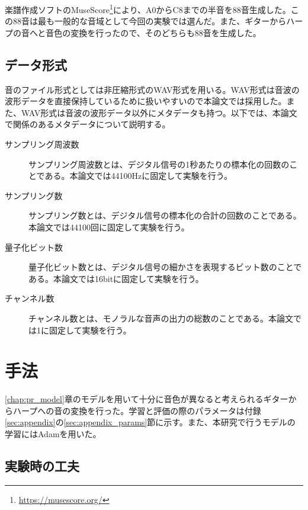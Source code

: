 楽譜作成ソフトのMuseScore\footnote{\url{https://musescore.org/}}により、A0からC8までの半音を88音生成した。この88音は最も一般的な音域として今回の実験では選んだ。また、ギターからハープの音へと音色の変換を行ったので、そのどちらも88音を生成した。

\subsection{データ形式}

音のファイル形式としては非圧縮形式のWAV形式を用いる。WAV形式は音波の波形データを直接保持しているために扱いやすいので本論文では採用した。また、WAV形式は音波の波形データ以外にメタデータも持つ。以下では、本論文で関係のあるメタデータについて説明する。

\begin{description}

\item[サンプリング周波数]\mbox{}

サンプリング周波数とは、デジタル信号の1秒あたりの標本化の回数のことである。本論文では44100Hzに固定して実験を行う。

\item[サンプリング数]\mbox{}

サンプリング数とは、デジタル信号の標本化の合計の回数のことである。本論文では44100回に固定して実験を行う。

\item[量子化ビット数]\mbox{}

量子化ビット数とは、デジタル信号の細かさを表現するビット数のことである。本論文では16bitに固定して実験を行う。

\item[チャンネル数]\mbox{}

チャンネル数とは、モノラルな音声の出力の総数のことである。本論文では1に固定して実験を行う。

\end{description}

\section{手法}

\ref{chap:pr_model}章のモデルを用いて十分に音色が異なると考えられるギターからハープへの音の変換を行った。学習と評価の際のパラメータは付録\ref{sec:appendix}の\ref{sec:appendix_params}節に示す。また、本研究で行うモデルの学習にはAdamを用いた。

\subsection{実験時の工夫}

